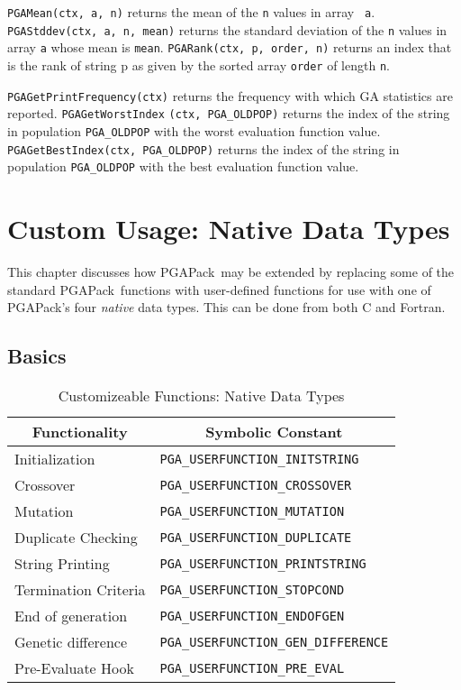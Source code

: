 \documentclass{report}
\newcommand{\pga}{PGAPack}
\begin{document}
{\tt PGAMean(ctx, a, n)} returns the mean of the {\tt n} values in array {\tt
a}. {\tt PGAStddev(ctx, a, n, mean)} returns the standard deviation of the
{\tt n} values in array {\tt a} whose mean is {\tt mean}.  {\tt PGARank(ctx,
p, order, n)} returns an index that is the rank of string p as given by the
sorted array {\tt order} of length {\tt n}.

\begin{sloppypar}
{\tt PGAGetPrintFrequency(ctx)} returns the frequency with which GA statistics
are reported. {\tt PGAGetWorstIndex} {\tt (ctx, PGA\_OLDPOP)} returns the
index of the string in population {\tt PGA\_OLDPOP} with the worst evaluation
function value.  {\tt PGAGetBestIndex(ctx, PGA\_OLDPOP)} returns the index of
the string in population {\tt PGA\_OLDPOP} with the best evaluation function
value.
\end{sloppypar}


\chapter{Custom Usage: Native Data Types}\label{chp:custom1}

This chapter discusses how \pga\ may be extended by replacing some of the
standard \pga\ functions with user-defined functions for use with one of
\pga's four {\em native}  data types.  This can be done from both C and
Fortran. 

\section{Basics}

\begin{table}
\centering
\caption
{Customizeable Functions: Native Data Types\label{tab:custom-functions1} }
\begin{tabular}{|l|l|} \hline\hline
\multicolumn{1}{|c|}{Functionality} &
\multicolumn{1}{c|}{Symbolic Constant} \\ \hline
Initialization       & \verb+PGA_USERFUNCTION_INITSTRING+ \\
Crossover            & \verb+PGA_USERFUNCTION_CROSSOVER+ \\
Mutation             & \verb+PGA_USERFUNCTION_MUTATION+ \\
Duplicate Checking   & \verb+PGA_USERFUNCTION_DUPLICATE+ \\
String Printing      & \verb+PGA_USERFUNCTION_PRINTSTRING+ \\
Termination Criteria & \verb+PGA_USERFUNCTION_STOPCOND+ \\
End of generation    & \verb+PGA_USERFUNCTION_ENDOFGEN+ \\
Genetic difference   & \verb+PGA_USERFUNCTION_GEN_DIFFERENCE+ \\
Pre-Evaluate Hook    & \verb+PGA_USERFUNCTION_PRE_EVAL+ \\
\hline
\end{tabular}
\end{table}
\end{document}
